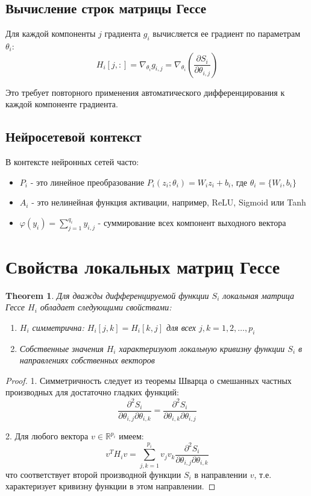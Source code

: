 \documentclass[12pt]{article}
\newtheorem{theorem}{Theorem}
\begin{document}
\subsection{Вычисление строк матрицы Гессе}
Для каждой компоненты $j$ градиента $g_i$ вычисляется ее градиент по параметрам $\theta_i$:
\begin{equation}
H_i[j,:] = \nabla_{\theta_i} g_{i,j} = \nabla_{\theta_i} \left( \frac{\partial S_i}{\partial \theta_{i,j}} \right)
\end{equation}

Это требует повторного применения автоматического дифференцирования к каждой компоненте градиента.

\subsection{Нейросетевой контекст}
В контексте нейронных сетей часто:
\begin{itemize}
\item $P_i$ - это линейное преобразование $P_i(z_i; \theta_i) = W_i z_i + b_i$, где $\theta_i = \{W_i, b_i\}$
\item $A_i$ - это нелинейная функция активации, например, ReLU, Sigmoid или Tanh
\item $\varphi(y_i) = \sum_{j=1}^{q_i} y_{i,j}$ - суммирование всех компонент выходного вектора
\end{itemize}

\section{Свойства локальных матриц Гессе}

\begin{theorem}
Для дважды дифференцируемой функции $S_i$ локальная матрица Гессе $H_i$ обладает следующими свойствами:
\begin{enumerate}
\item $H_i$ симметрична: $H_i[j,k] = H_i[k,j]$ для всех $j,k = 1,2,\ldots,p_i$
\item Собственные значения $H_i$ характеризуют локальную кривизну функции $S_i$ в направлениях собственных векторов
\end{enumerate}
\end{theorem}

\begin{proof}
1. Симметричность следует из теоремы Шварца о смешанных частных производных для достаточно гладких функций:
\begin{equation}
\frac{\partial^2 S_i}{\partial \theta_{i,j} \partial \theta_{i,k}} = \frac{\partial^2 S_i}{\partial \theta_{i,k} \partial \theta_{i,j}}
\end{equation}

2. Для любого вектора $v \in \mathbb{R}^{p_i}$ имеем:
\begin{equation}
v^T H_i v = \sum_{j,k=1}^{p_i} v_j v_k \frac{\partial^2 S_i}{\partial \theta_{i,j} \partial \theta_{i,k}}
\end{equation}
что соответствует второй производной функции $S_i$ в направлении $v$, т.е. характеризует кривизну функции в этом направлении.
\end{proof}
\end{document}
